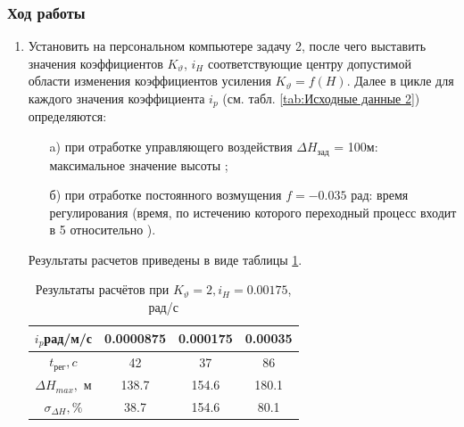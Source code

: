 \documentclass[a4paper,12pt]{article}
\begin{document}
        \subsubsection{Ход работы}
            	\begin{enumerate}
		            \item Установить на персональном компьютере задачу 2, после чего выставить
                        значения коэффициентов $K_{\vartheta}$, $i_H$ соответствующие центру допустимой
                        области изменения коэффициентов усиления $K_{\vartheta}=f(H)$. Далее в цикле для
                        каждого значения коэффициента  $i_p$ (см. табл. \ref{tab:Исходные данные 2}) определяются:
                            \begin{itemize}
                                \item[a)] при отработке управляющего воздействия $\Delta H_{зад}$ = 100м:
                                        максимальное значение высоты ;
                                \item[б)] при отработке постоянного возмущения  $f=-0.035$ рад:
                                время регулирования   (время, по истечению которого переходный процесс  входит в 5%
                                относительно ).
                            \end{itemize}
                            Результаты расчетов приведены в виде таблицы \ref{tab:Таблица с результатами лаба2}.
                            
                            \begin{table}[H]
                                \centering
                                \begin{tabular}{|c|c|c|c|}
                                \hline
                                    $i_p$рад/м/с & 0.0000875 & 0.000175 &0.00035\\ \hline
                                    $t_{рег}, c$ & 42 & 37 &86\\ \hline
                                    $\Delta H_{max},$ м &  138.7  & 154.6 & 180.1 \\ \hline
                                    $\sigma_{\Delta H}, \%$  & 38.7  & 154.6  &  80.1 \\ \hline
                                \end{tabular}
                                \caption{Результаты расчётов при $K_{\vartheta}=2, i_H=0.00175$, рад/с}
                                \label{tab:Таблица с результатами лаба2}
                            \end{table}
                            

\end{enumerate}
\end{document}

